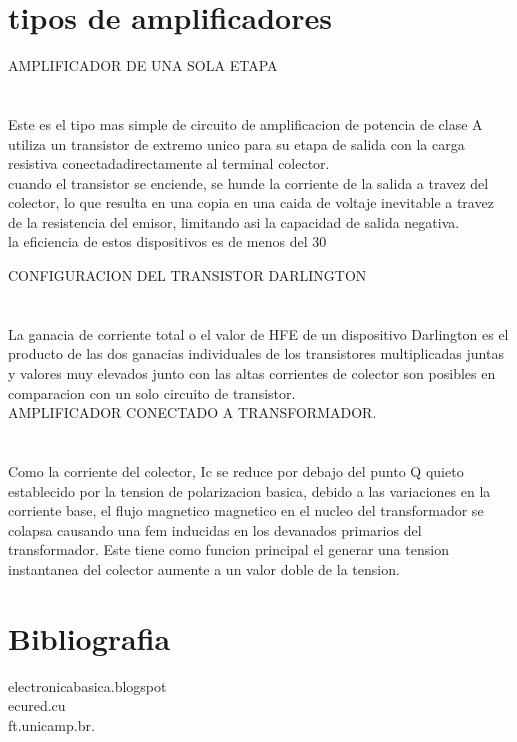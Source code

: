 \documentclass[12pt]{article}
\begin{document}
\maketitle
\section{tipos de amplificadores}
AMPLIFICADOR DE UNA SOLA ETAPA\\\\\\
Este es el tipo mas simple de circuito de amplificacion de potencia de clase A utiliza un transistor de extremo unico para su etapa de salida con la carga resistiva conectadadirectamente al terminal colector.\\ cuando el transistor se enciende, se hunde la corriente de la salida a travez del colector, lo que resulta en una copia en una caida de voltaje inevitable a travez de la resistencia del emisor, limitando asi la capacidad de salida negativa.\\
la eficiencia de estos dispositivos es de menos del 30%

CONFIGURACION DEL TRANSISTOR DARLINGTON\\\\\\
La ganacia de corriente total o el valor de HFE de un dispositivo Darlington es el producto  de las dos ganacias individuales  de los transistores multiplicadas juntas  y valores muy elevados junto con las altas corrientes de colector son posibles en comparacion con un solo circuito de transistor.\\


AMPLIFICADOR CONECTADO A TRANSFORMADOR.\\\\\\

Como la corriente del colector, Ic se reduce por debajo del punto Q quieto establecido por la tension de polarizacion basica, debido a las variaciones en la corriente base, el flujo magnetico magnetico en el nucleo del transformador se colapsa causando una fem inducidas en los devanados primarios del transformador. Este tiene como funcion principal el generar una tension instantanea del colector aumente a un valor doble de la tension.  


\section{Bibliografia}
electronicabasica.blogspot\\
ecured.cu\\
ft.unicamp.br.
\end{document}
